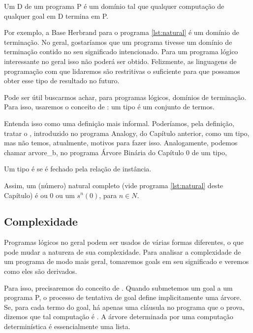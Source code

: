 \begin{definition}
  Um  D de um programa P é um domínio
  tal que qualquer computação de qualquer goal em D termina em P.
\end{definition}

Por exemplo, a Base Herbrand para o programa \ref{lst:natural} é um
domínio de terminação.  No geral, gostaríamos que um programa tivesse
um domínio de terminação contido no seu significado intencionado. Para
um programa lógico interessante no geral isso não poderá ser
obtido. Felizmente, as linguagens de programação com que lidaremos são
restritivas o suficiente para que possamos obter esse tipo de
resultado no futuro.

Pode ser útil buscarmos achar, para programas lógicos, domínios de
terminação. Para isso, usaremos o conceito de : um tipo
é um conjunto de termos.

Entenda isso como uma definição mais informal. Poderíamos, pela
definição, tratar o , introduzido no programa Analogy,
do Capítulo anterior, como um tipo, mas não temos, atualmente, motivos
para fazer isso.  Analogamente, podemos chamar arvore\_b, no programa
Árvore Binária do Capítulo 0 de um tipo, %

\begin{definition}
  Um tipo é  se é fechado pela relação de instância.
\end{definition}

Assim, um (número) natural completo (vide programa \ref{lst:natural}
deste Capítulo) é ou 0 ou um $s^n(0)$, para $n \in N$.

\subsection{Complexidade}

Programas lógicos no geral podem ser usados de várias formas
diferentes, o que pode mudar a natureza de sua complexidade. Para
analisar a complexidade de um programa de modo mais geral, tomaremos
goals em seu significado e veremos como eles são derivados.

Para isso, precisaremos do conceito de . Quando submetemos um goal a um programa P, o processo de
tentativa de goal define implicitamente uma árvore. Se, para cada
termo do goal, há apenas uma cláusula no programa que o prova, dizemos
que tal computação é . A árvore determinada
por uma computação determinística é essencialmente uma lista.

